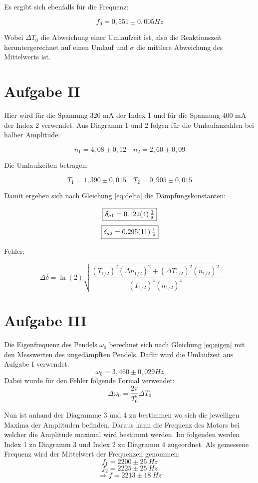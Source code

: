 Es ergibt sich ebenfalls für die Frequenz:

\[\boxed{f_0 = 0,551 \pm 0,005 \si{Hz}}\]

Wobei $\Delta T_0$ die Abweichung einer Umlaufzeit ist, also die Reaktionszeit heruntergerechnet auf einen Umlauf und $\sigma$ die
mittlere Abweichung des Mittelwerts ist.


\section{Aufgabe II}
Hier wird für die Spannung $320$ mA der Index 1 und für die Spannung $400$ mA der Index 2 verwendet. 
Aus Diagramm 1 und 2 folgen für die Umlaufanzahlen bei halber Amplitude:

\[n_1 = 4,08 \pm 0,12\quad n_2 = 2,60 \pm 0,09\]

Die Umlaufzeiten betragen:

\[T_1 = 1,390 \pm 0,015\quad T_2 = 0,905 \pm 0,015\]

Damit ergeben sich nach Gleichung \ref{eq:delta} die Dämpfungskonstanten:

    \[\boxed{\delta_{a1} = \SI{0,122 \pm 0,004}{\tfrac{1}{\second}}}\notag\]
    \[\boxed{\delta_{a2} = \SI{0,295 \pm 0,011}{\tfrac{1}{\second}}}\notag\]

Fehler:

\[\Delta \delta=\ln(2) \sqrt{\frac{(T_{1/2})^{2} (\Delta n_{1/2})^{2} + (\Delta T_{1/2})^{2} (n_{1/2})^{2}}{(T_{1/2})^{4} (n_{1/2})^{4}}}\]


\section{Aufgabe III}

Die Eigenfrequenz des Pendels $\omega_0$ berechnet sich nach Gleichung \ref{eq:eigen} mit den Messwerten des ungedämpften Pendels.
Dafür wird die Umlaufzeit aus Aufgabe I verwendet.
\[\omega_0 = 3,460 \pm 0,029 \si{Hz}\]
Dabei wurde für den Fehler folgende Formal verwendet:
\begin{equation}
   \Delta \omega_0 = \frac{2\pi}{T_0^2}\Delta T_0
\end{equation}

Nun ist anhand der Diagramme 3 und 4 zu bestimmen wo sich die jeweiligen Maxima der Amplituden befinden.
Daraus kann die Frequenz des Motors bei welcher die Amplitude  maximal wird bestimmt werden.
Im folgenden werden Index 1 zu Diagramm 3 und Index 2 zu Diagramm 4 zugeordnet.
Als gemessene Frequenz wird der Mittelwert der Frequenzen genommen:
\[ f_1 = 2200 \pm 25\ \si{Hz}\]
\[ f_2 = 2225 \pm 25\ \si{Hz} \]
\[\Rightarrow f = 2213 \pm 18 \ \si{Hz}\]

